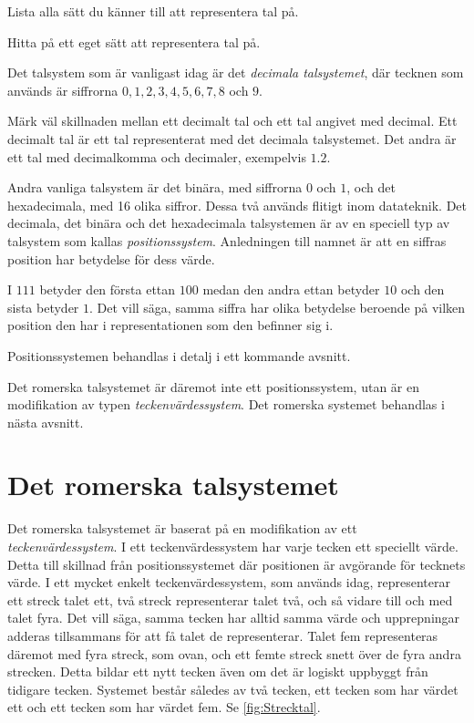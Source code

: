 \begin{exercise}\label{xrc:HittaTalsystem}
  Lista alla sätt du känner till att representera tal på.
\end{exercise}
\begin{exercise}\label{xrc:SkapaTalsystem}
  Hitta på ett eget sätt att representera tal på.
\end{exercise}

Det talsystem som är vanligast idag är det \emph{decimala talsystemet}, där
tecknen som används är siffrorna \(0, 1, 2, 3, 4, 5, 6, 7, 8\) och \(9\).
\begin{remark}
  Märk väl skillnaden mellan ett decimalt tal och ett tal angivet med decimal.
  Ett decimalt tal är ett tal representerat med det decimala talsystemet.
  Det andra är ett tal med decimalkomma och decimaler, exempelvis
  \(1.2\).
\end{remark}
Andra vanliga talsystem är det binära, med siffrorna \(0\) och \(1\), och det
hexadecimala, med 16 olika siffror.
Dessa två används flitigt inom datateknik.
Det decimala, det binära och det hexadecimala talsystemen är av en speciell
typ av talsystem som kallas \emph{positionssystem}.
Anledningen till namnet är att en siffras position har betydelse för dess
värde.
\begin{example}\label{ex:PositionensBetydelse}
  I \(111\) betyder den första ettan \(100\) medan den andra ettan
  betyder \(10\) och den sista betyder \(1\).
  Det vill säga, samma siffra har olika betydelse beroende på vilken position
  den har i representationen som den befinner sig i.
\end{example}
Positionssystemen behandlas i detalj i ett kommande avsnitt.

Det romerska talsystemet är däremot inte ett positionssystem, utan är en
modifikation av typen \emph{teckenvärdessystem}.
Det romerska systemet behandlas i nästa avsnitt.


\section{Det romerska talsystemet}
\label{sec:RomerskaTalsystemet}
Det romerska talsystemet är baserat på en modifikation av ett
\emph{teckenvärdessystem}.
I ett teckenvärdessystem har varje tecken ett speciellt värde.
Detta till skillnad från positionssystemet där positionen är avgörande för
tecknets värde.
I ett mycket enkelt teckenvärdessystem, som används idag, representerar ett
streck talet ett, två streck representerar talet två, och så vidare till och
med talet fyra.
Det vill säga, samma tecken har alltid samma värde och upprepningar adderas
tillsammans för att få talet de representerar.
Talet fem representeras däremot med fyra streck, som ovan, och ett femte streck
snett över de fyra andra strecken.
Detta bildar ett nytt tecken även om det är logiskt uppbyggt från tidigare
tecken.
Systemet består således av två tecken, ett tecken som har värdet ett och ett
tecken som har värdet fem.
Se \cref{fig:Strecktal}.

